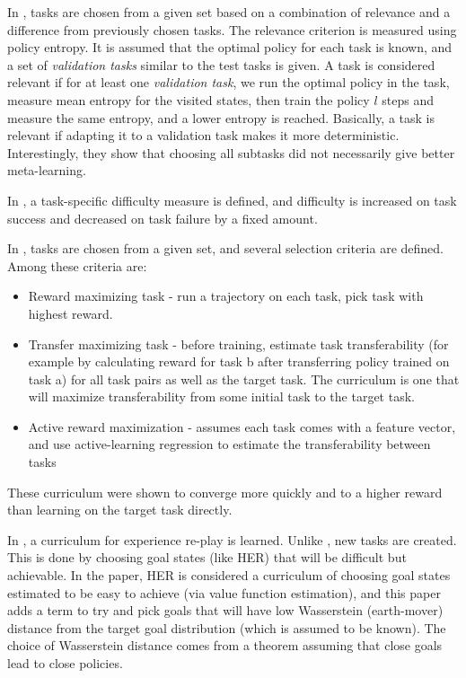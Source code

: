 \documentclass[letterpaper]{article}
\theoremstyle{definition}
\begin{document}
In \cite{Gutierrez2020}, tasks are chosen from a given set based on a combination of relevance and a difference from previously chosen tasks. The relevance criterion is measured using policy entropy. It is assumed that the optimal policy for each task is known, and a set of \textit{validation tasks} similar to the test tasks is given.
A task is considered relevant if for at least one \textit{validation task}, we run the optimal policy in the task, measure mean entropy for the visited states, then train the policy $l$ steps and measure the same entropy, and a lower entropy is reached. Basically, a task is relevant if adapting it to a validation task makes it more deterministic.
Interestingly, they show that choosing all subtasks did not necessarily give better meta-learning.

In \cite{Justesen2018}, a task-specific difficulty measure is defined, and difficulty is increased on task success and decreased on task failure by a fixed amount.

In \cite{Jain2017}, tasks are chosen from a given set, and several selection criteria are defined. Among these criteria are:
\begin{itemize}
	\item Reward maximizing task - run a trajectory on each task, pick task with highest reward.
	\item Transfer maximizing task - before training, estimate task transferability (for example by calculating reward for task b after transferring policy trained on task a) for all task pairs as well as the target task. The curriculum is one that will maximize transferability from some initial task to the target task.
	\item Active reward maximization - assumes each task comes with a feature vector, and use active-learning regression to estimate the transferability between tasks
\end{itemize}
These curriculum were shown to converge more quickly and to a higher reward than learning on the target task directly.

In \cite{Reny2019}, a curriculum for experience re-play is learned. Unlike \cite{Jiang2020}, new tasks are created. This is done by choosing goal states (like HER) that will be difficult but achievable. In the paper, HER is considered a curriculum of choosing goal states estimated to be easy to achieve (via value function estimation), and this paper adds a term to try and pick goals that will have low Wasserstein (earth-mover) distance from the target goal distribution (which is assumed to be known). The choice of Wasserstein distance comes from a theorem assuming that close goals lead to close policies.
\end{document}
